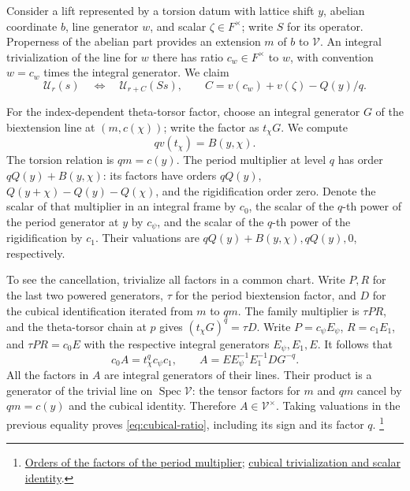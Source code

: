 Consider a lift represented by a torsion datum with lattice shift
\(y\), abelian coordinate \(b\), line generator \(w\), and scalar
\(\zeta\in F^\times\); write \(S\) for its operator. Properness
of the abelian part provides an extension \(m\) of \(b\) to
\(\mathcal V\). An integral trivialization of the line for \(w\)
there has ratio \(c_w\in F^\times\) to \(w\), with convention
\(w=c_w\) times the integral generator. We claim
\begin{equation}\label{eq:theta-liftshift}
 \mathcal U_r(s)\quad\Longleftrightarrow\quad
 \mathcal U_{r+C}(Ss),\qquad
       C=v(c_w)+v(\zeta)-Q(y)/q .
\end{equation}

For the index-dependent theta-torsor factor, choose an integral
generator \(G\) of the biextension line at \((m,c(\chi))\); write
the factor as \(t_\chi G\). We compute
\begin{equation}\label{eq:cubical-ratio}
                        qv(t_\chi)=B(y,\chi).
\end{equation}
The torsion relation is \(qm=c(y)\). The period multiplier at
level \(q\) has order \(qQ(y)+B(y,\chi)\): its factors have
orders \(qQ(y)\), \(Q(y+\chi)-Q(y)-Q(\chi)\), and the rigidification
order zero. Denote the scalar of that multiplier in an integral
frame by \(c_0\), the scalar of the \(q\)-th power of the period
generator at \(y\) by \(c_\psi\), and the scalar of the \(q\)-th
power of the rigidification by \(c_1\). Their valuations are
\(qQ(y)+B(y,\chi),qQ(y),0\), respectively.

To see the cancellation, trivialize all factors in a common chart.
Write \(P,R\) for the last two powered generators, \(\tau\) for the
period biextension factor, and \(D\) for the cubical identification
iterated from \(m\) to \(qm\). The family multiplier is
\(\tau P R\), and the theta-torsor chain at \(p\) gives
\((t_\chi G)^q=\tau D\). Write \(P=c_\psi E_\psi\),
\(R=c_1 E_1\), and \(\tau PR=c_0 E\) with the respective integral
generators \(E_\psi,E_1,E\). It follows that
\[
       c_0 A=t_\chi^q c_\psi c_1,\qquad
       A=E E_\psi^{-1} E_1^{-1} D G^{-q}.
\]
All the factors in \(A\) are integral generators of their lines.
Their product is a generator of the trivial line on
\(\operatorname{Spec}\mathcal V\): the tensor factors for \(m\)
and \(qm\) cancel by \(qm=c(y)\) and the cubical identity.
Therefore \(A\in\mathcal V^\times\). Taking valuations in the
previous equality proves \eqref{eq:cubical-ratio}, including its
sign and its factor \(q\).
\footnote{\href{https://github.com/ChristianKudeba/alpoge-rh-verification/blob/alpoge-source-7cbf7a0c/src/ReciprocityTheory/ReductiveGroups/ArithmeticGeometry/DiscreteValuationRings/ExistsValGenHasVal.lean}{Orders of the factors of the period multiplier};
\href{https://github.com/ChristianKudeba/alpoge-rh-verification/blob/alpoge-source-7cbf7a0c/src/Development/AbelianVarietyTheory/Proofs/RingsOfIntegers/ValuationThetaRatioEqBilinear.lean}{cubical trivialization and scalar identity}.}


